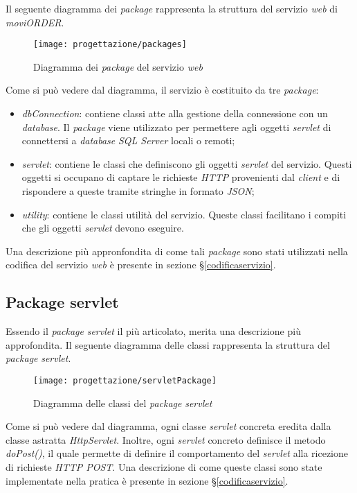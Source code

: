 Il seguente diagramma dei \textit{package} rappresenta la struttura del servizio \textit{web} di \textit{moviORDER}.

\begin{figure}[!h] 
    \centering 
    \texttt{[image: progettazione/packages]} 
    \caption{Diagramma dei \textit{package} del servizio \textit{web}}
\end{figure}

Come si può vedere dal diagramma, il servizio è costituito da tre \textit{package}:
\begin{itemize}
	\item \textit{dbConnection}: contiene classi atte alla gestione della connessione con un \textit{database}. Il \textit{package} viene utilizzato per permettere agli oggetti \textit{servlet} di connettersi a \textit{database} \textit{SQL Server} locali o remoti;
	\item \textit{servlet}: contiene le classi che definiscono gli oggetti \textit{servlet} del servizio. Questi oggetti si occupano di captare le richieste \textit{HTTP} provenienti dal \textit{client} e di rispondere a queste tramite stringhe in formato \textit{JSON};
	\item \textit{utility}: contiene le classi utilità del servizio. Queste classi facilitano i compiti che gli oggetti \textit{servlet} devono eseguire.
\end{itemize}
Una descrizione più appronfondita di come tali \textit{package} sono stati utilizzati nella codifica del servizio \textit{web} è presente in sezione §\ref{codificaservizio}.

\subsection{Package servlet}

Essendo il \textit{package} \textit{servlet} il più articolato, merita una descrizione più approfondita. Il seguente diagramma delle classi rappresenta la struttura del \textit{package} \textit{servlet}.

\begin{figure}[!h] 
    \centering 
    \texttt{[image: progettazione/servletPackage]} 
    \caption{Diagramma delle classi del \textit{package} \textit{servlet}}
\end{figure}

Come si può vedere dal diagramma, ogni classe \textit{servlet} concreta eredita dalla classe astratta \textit{HttpServlet}. Inoltre, ogni \textit{servlet} concreto definisce il metodo \textit{doPost()}, il quale permette di definire il comportamento del \textit{servlet} alla ricezione di richieste \textit{HTTP POST}. Una descrizione di come queste classi sono state implementate nella pratica è presente in sezione §\ref{codificaservizio}.

